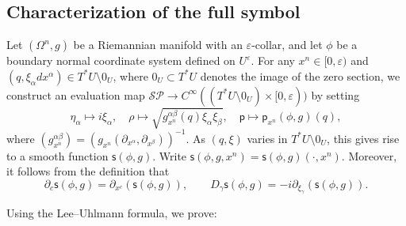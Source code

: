 \documentclass[11pt]{amsart}
\theoremstyle{definition}
\numberwithin{equation}{section}
\begin{document}
\subsection{Characterization of the full symbol}
 


Let $(\Omega^n,g)$ be a Riemannian manifold with an $\varepsilon$-collar, and let $\phi$ be a boundary normal coordinate system defined on $U^\varepsilon$. For any $x^n\in[0,\varepsilon)$ and $(q,\xi_\alpha dx^\alpha)\in T^*U\setminus 0_U$, where $0_U\subset T^*U$ denotes the image of the zero section, we construct an evaluation map $\mathcal{SP}\to C^\infty((T^*U\setminus 0_U)\times[0,\varepsilon))$ by setting
\[\eta_\alpha\mapsto i\xi_\alpha,\quad \rho \mapsto\sqrt{g_{x^n}^{\alpha\beta}(q)\xi_\alpha\xi_\beta},\quad \mathsf p\mapsto \mathsf p_{x^n}(\phi,g)(q),\]
where $(g_{x^n}^{\alpha\beta}) = (g_{x^n}(\partial_{x^\alpha},\partial_{x^\beta}))^{-1}.$ As $(q,\xi)$ varies in $T^*U\setminus 0_U$, this gives rise to a smooth function $\mathsf s(\phi,g)$. Write $\mathsf s(\phi,g,x^n) = \mathsf s(\phi,g)(\cdot,x^n)$. Moreover, it follows from the definition that
\[\partial_c\mathsf s(\phi,g) = \partial_{x^c}(\mathsf s(\phi,g)),\qquad D_\gamma\mathsf s(\phi,g) = -i\partial_{\xi_\gamma}(\mathsf s(\phi,g)).\]

Using the Lee--Uhlmann formula, we prove:
\end{document}
